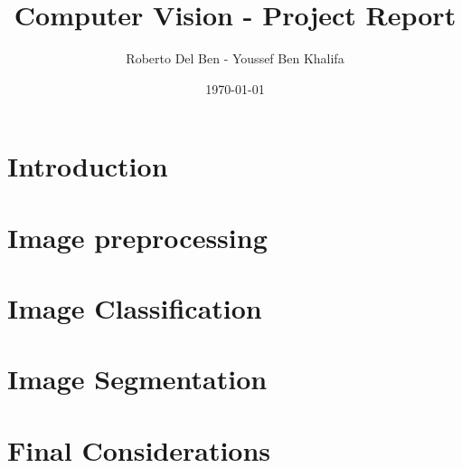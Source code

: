 
\title{Computer Vision - Project Report}
\author{Roberto Del Ben - Youssef Ben Khalifa}
\date{\today}

\maketitle \tableofcontents
\newpage

\section{Introduction}

\section{Image preprocessing}

\section{Image Classification}

\section{Image Segmentation}

\section{Final Considerations}

